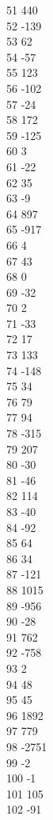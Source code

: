 { 51	440 \\
 52	-139 \\
 53	62 \\
 54	-57 \\
 55	123 \\
 56	-102 \\
 57	-24 \\
 58	172 \\
 59	-125 \\
 60	3 \\
 61	-22 \\
 62	35 \\
 63	-9 \\
 64	897 \\
 65	-917 \\
 66	4 \\
 67	43 \\
 68	0 \\
 69	-32 \\
 70	2 \\
 71	-33 \\
 72	17 \\
 73	133 \\
 74	-148 \\
 75	34 \\
 76	79 \\
 77	94 \\
 78	-315 \\
 79	207 \\
 80	-30 \\
 81	-46 \\
 82	114 \\
 83	-40 \\
 84	-92 \\
 85	64 \\
 86	34 \\
 87	-121 \\
 88	1015 \\
 89	-956 \\
 90	-28 \\
 91	762 \\
 92	-758 \\
 93	2 \\
 94	48 \\
 95	45 \\
 96	1892 \\
 97	779 \\
 98	-2751 \\
 99	-2 \\
 100	-1 \\
 101	105 \\
 102	-91 \\
}
